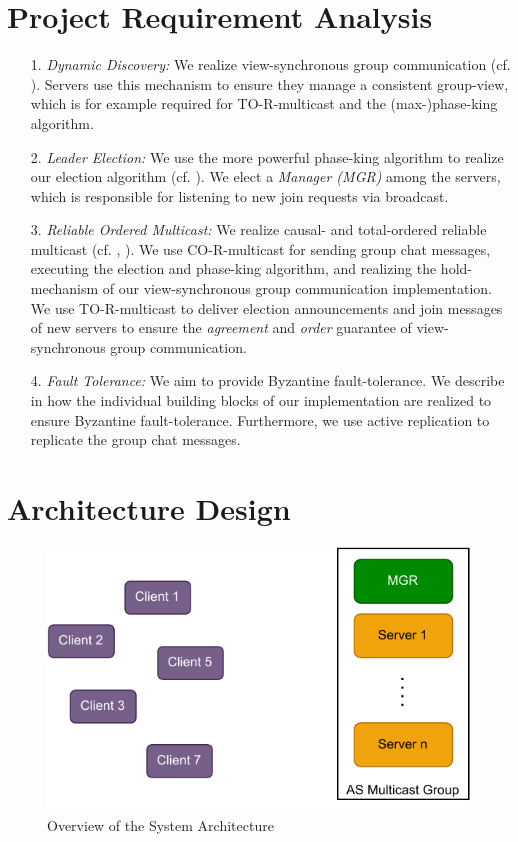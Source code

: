 \documentclass[runningheads]{llncs}
\begin{document}
\section{Project Requirement Analysis} \label{sec:req_analysis}
\begin{enumerate}
    \item[1.] \textit{Dynamic Discovery:} We realize view-synchronous group communication (cf. ). Servers use this mechanism to ensure they manage a consistent group-view, which is for example required for TO-R-multicast and the (max-)phase-king algorithm.
    \item[2.] \textit{Leader Election:} We use the more powerful phase-king algorithm to realize our election algorithm (cf. ). We elect a \textit{Manager (MGR)} among the servers, which is responsible for listening to new join requests via broadcast. 
    \item[3.] \textit{Reliable Ordered Multicast:} We realize causal- and total-ordered reliable multicast (cf. , ). We use CO-R-multicast for sending group chat messages, executing the election and phase-king algorithm, and realizing the hold-mechanism of our view-synchronous group communication implementation. We use TO-R-multicast to deliver election announcements and join messages of new servers to ensure the \textit{agreement} and \textit{order} guarantee of view-synchronous group communication.
    \item[4.] \textit{Fault Tolerance:} We aim to provide Byzantine fault-tolerance. We describe in  how the individual building blocks of our implementation are realized to ensure Byzantine fault-tolerance. Furthermore, we use active replication to replicate the group chat messages.
\end{enumerate}

\section{Architecture Design} \label{sec:arch_design}

\begin{figure}[b]
    \centering
    \includegraphics[scale=0.7]{graphics/DS_Architecture.pdf}
    \caption{Overview of the System Architecture}
    \label{fig:overview}
\end{figure}
\end{document}
